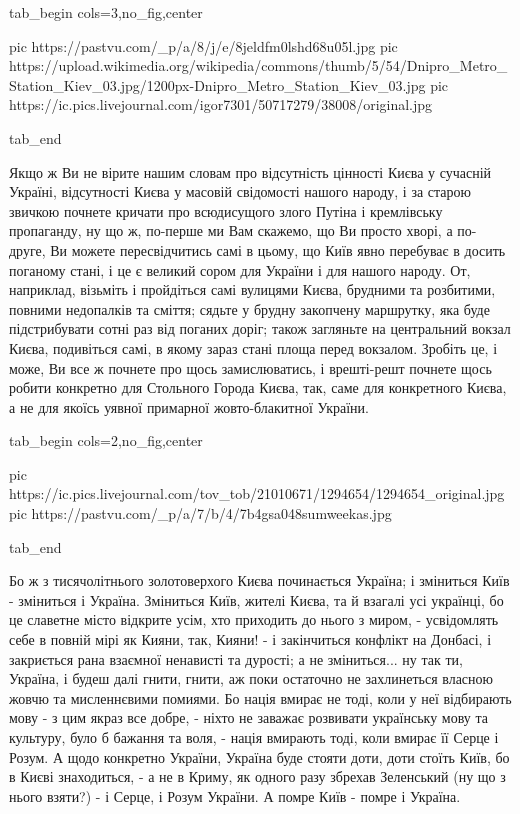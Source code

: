 \ifcmt
  tab_begin cols=3,no_fig,center

     pic https://pastvu.com/_p/a/8/j/e/8jeldfm0lshd68u05l.jpg
		 pic https://upload.wikimedia.org/wikipedia/commons/thumb/5/54/Dnipro_Metro_Station_Kiev_03.jpg/1200px-Dnipro_Metro_Station_Kiev_03.jpg
		 pic https://ic.pics.livejournal.com/igor7301/50717279/38008/original.jpg

  tab_end
\fi

Якщо ж Ви не вірите нашим словам про відсутність цінності Києва у сучасній
Україні, відсутності Києва у масовій свідомості нашого народу, і за старою
звичкою почнете кричати про всюдисущого злого Путіна і кремлівську пропаганду,
ну що ж, по-перше ми Вам скажемо, що Ви просто хворі, а по-друге, Ви можете
пересвідчитись самі в цьому, що Київ явно перебуває в досить поганому стані, і
це є великий сором для України і для нашого народу. От, наприклад, візьміть і
пройдіться самі вулицями Києва, брудними та розбитими, повними недопалків та
сміття; сядьте у брудну закопчену маршрутку, яка буде підстрибувати сотні раз
від поганих доріг; також загляньте на центральний вокзал Києва, подивіться
самі, в якому зараз стані площа перед вокзалом.  Зробіть це, і може, Ви все ж
почнете про щось замислюватись, і врешті-решт почнете щось робити конкретно для
Стольного Города Києва, так, саме для конкретного Києва, а не для якоїсь уявної
примарної жовто-блакитної України. 


\ifcmt
  tab_begin cols=2,no_fig,center

     pic https://ic.pics.livejournal.com/tov_tob/21010671/1294654/1294654_original.jpg
		 pic https://pastvu.com/_p/a/7/b/4/7b4gsa048sumweekas.jpg

  tab_end
\fi

Бо ж з тисячолітнього золотоверхого Києва починається Україна; і зміниться Київ
- зміниться і Україна. Зміниться Київ, жителі Києва, та й взагалі усі українці,
бо це славетне місто відкрите усім, хто приходить до нього з миром, -
усвідомлять себе в повній мірі як Кияни, так, Кияни! - і закінчиться конфлікт
на Донбасі, і закриється рана взаємної ненависті та дурості; а не зміниться...
ну так ти, Україна, і будеш далі гнити, гнити, аж поки остаточно не захлинеться
власною жовчю та мисленнєвими помиями.  Бо нація вмирає не тоді, коли у неї
відбирають мову - з цим якраз все добре, - ніхто не заважає розвивати
українську мову та культуру, було б бажання та воля, - нація вмирають тоді,
коли вмирає її Серце і Розум. А щодо конкретно України, Україна буде стояти
доти, доти стоїть Київ, бо в Києві знаходиться, - а не в Криму, як одного разу
збрехав Зеленський (ну що з нього взяти?) - і Серце, і Розум України. А помре
Київ - помре і Україна. 

